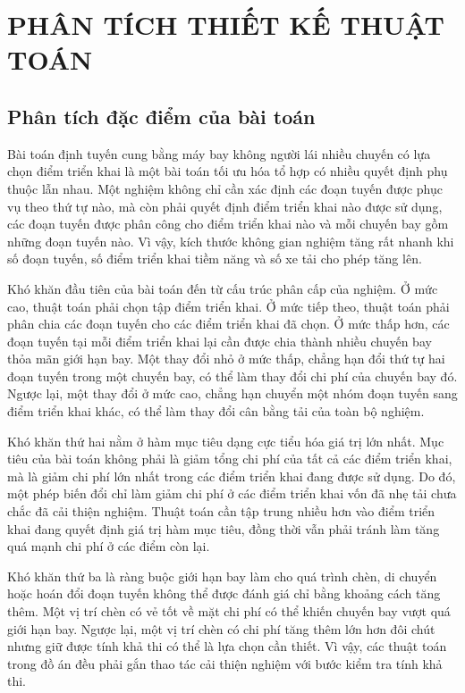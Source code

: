 \chapter{PHÂN TÍCH THIẾT KẾ THUẬT TOÁN}
\label{chap:phan-tich-thiet-ke-thuat-toan}

\section{Phân tích đặc điểm của bài toán}

Bài toán định tuyến cung bằng máy bay không người lái nhiều chuyến có lựa chọn điểm triển khai là một bài toán tối ưu hóa tổ hợp có nhiều quyết định phụ thuộc lẫn nhau. Một nghiệm không chỉ cần xác định các đoạn tuyến được phục vụ theo thứ tự nào, mà còn phải quyết định điểm triển khai nào được sử dụng, các đoạn tuyến được phân công cho điểm triển khai nào và mỗi chuyến bay gồm những đoạn tuyến nào. Vì vậy, kích thước không gian nghiệm tăng rất nhanh khi số đoạn tuyến, số điểm triển khai tiềm năng và số xe tải cho phép tăng lên.

Khó khăn đầu tiên của bài toán đến từ cấu trúc phân cấp của nghiệm. Ở mức cao, thuật toán phải chọn tập điểm triển khai. Ở mức tiếp theo, thuật toán phải phân chia các đoạn tuyến cho các điểm triển khai đã chọn. Ở mức thấp hơn, các đoạn tuyến tại mỗi điểm triển khai lại cần được chia thành nhiều chuyến bay thỏa mãn giới hạn bay. Một thay đổi nhỏ ở mức thấp, chẳng hạn đổi thứ tự hai đoạn tuyến trong một chuyến bay, có thể làm thay đổi chi phí của chuyến bay đó. Ngược lại, một thay đổi ở mức cao, chẳng hạn chuyển một nhóm đoạn tuyến sang điểm triển khai khác, có thể làm thay đổi cân bằng tải của toàn bộ nghiệm.

Khó khăn thứ hai nằm ở hàm mục tiêu dạng cực tiểu hóa giá trị lớn nhất. Mục tiêu của bài toán không phải là giảm tổng chi phí của tất cả các điểm triển khai, mà là giảm chi phí lớn nhất trong các điểm triển khai đang được sử dụng. Do đó, một phép biến đổi chỉ làm giảm chi phí ở các điểm triển khai vốn đã nhẹ tải chưa chắc đã cải thiện nghiệm. Thuật toán cần tập trung nhiều hơn vào điểm triển khai đang quyết định giá trị hàm mục tiêu, đồng thời vẫn phải tránh làm tăng quá mạnh chi phí ở các điểm còn lại.

Khó khăn thứ ba là ràng buộc giới hạn bay làm cho quá trình chèn, di chuyển hoặc hoán đổi đoạn tuyến không thể được đánh giá chỉ bằng khoảng cách tăng thêm. Một vị trí chèn có vẻ tốt về mặt chi phí có thể khiến chuyến bay vượt quá giới hạn bay. Ngược lại, một vị trí chèn có chi phí tăng thêm lớn hơn đôi chút nhưng giữ được tính khả thi có thể là lựa chọn cần thiết. Vì vậy, các thuật toán trong đồ án đều phải gắn thao tác cải thiện nghiệm với bước kiểm tra tính khả thi.

